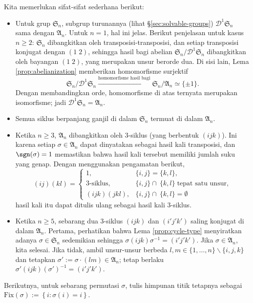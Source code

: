 Kita memerlukan sifat-sifat sederhana berikut:
\begin{itemize}
	\item Untuk grup $\mathfrak{S}_n$, subgrup turunannya (lihat \S\ref{sec:solvable-groups}) $\mathscr{D}^1 \mathfrak{S}_n$ sama dengan $\mathfrak{A}_n$. Untuk $n=1$, hal ini jelas. Berikut penjelasan untuk kasus $n \geq 2$: $\mathfrak{S}_n$ dibangkitkan oleh transposisi-transposisi, dan setiap transposisi konjugat dengan $(1 \; 2)$, sehingga hasil bagi abelian $\mathfrak{S}_n / \mathscr{D}^1 \mathfrak{S}_n$ dibangkitkan oleh bayangan $(1 \; 2)$, yang merupakan unsur berorde dua. Di sisi lain, Lema \ref{prop:abelianization} memberikan homomorfisme surjektif
		\[ \mathfrak{S}_n / \mathscr{D}^1 \mathfrak{S}_n \stackrel{\text{homomorfisme hasil bagi}}{\twoheadrightarrow} \mathfrak{S}_n/\mathfrak{A}_n \simeq \{ \pm 1\}. \]
		Dengan membandingkan orde, homomorfisme di atas ternyata merupakan isomorfisme; jadi $\mathscr{D}^1 \mathfrak{S}_n = \mathfrak{A}_n$.
	\item Semua siklus berpanjang ganjil di dalam $\mathfrak{S}_n$ termuat di dalam $\mathfrak{A}_n$.
	\item Ketika $n \geq 3$, $\mathfrak{A}_n$ dibangkitkan oleh $3$-siklus (yang berbentuk $(i j k)$). Ini karena setiap $\sigma \in \mathfrak{A}_n$ dapat dinyatakan sebagai hasil kali transposisi, dan $\sgn(\sigma)=1$ memastikan bahwa hasil kali tersebut memiliki jumlah suku yang genap. Dengan menggunakan pengamatan berikut,
		\[ (i j)(k l) = \begin{cases}
			1, & \{i,j\} = \{k,l\}, \\
			\text{$3$-siklus}, & \{i,j\} \cap \ \{k,l\}\; \text{tepat satu unsur}, \\
			(i j k) (j k l), & \{i,j\} \cap \ \{k,l\} = \emptyset
		\end{cases} \]
		hasil kali itu dapat ditulis ulang sebagai hasil kali $3$-siklus.
	\item Ketika $n \geq 5$, sebarang dua $3$-siklus $(i j k)$ dan $(i' j' k')$ saling konjugat di dalam $\mathfrak{A}_n$. Pertama, perhatikan bahwa Lema \ref{prop:cycle-type} menyiratkan adanya $\sigma \in \mathfrak{S}_n$ sedemikian sehingga $\sigma (i j k) \sigma^{-1} = (i' j' k')$. Jika $\sigma \in \mathfrak{A}_n$, kita selesai. Jika tidak, ambil unsur-unsur berbeda $l, m \in \{1, \ldots, n\} \smallsetminus \{i,j,k\}$ dan tetapkan $\sigma' := \sigma \cdot (l m) \in \mathfrak{A}_n$; tetap berlaku $\sigma' (i j k) (\sigma')^{-1} = (i' j' k')$.
\end{itemize}
Berikutnya, untuk sebarang permutasi $\sigma$, tulis himpunan titik tetapnya sebagai $\text{Fix}(\sigma) := \left\{ i: \sigma(i)=i \right\}$.

